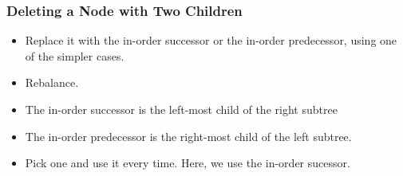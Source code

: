 \documentclass{beamer}
\begin{document}

\begin{frame}
\frametitle{Deleting a Node with Two Children}
\begin{itemize}
\item Replace it with the in-order successor or the in-order predecessor, using one of the simpler cases.
\item Rebalance.
\item The in-order successor is the left-most child of the right subtree
\item The in-order predecessor is the right-most child of the left subtree. 
\item Pick one and use it every time. Here, we use the in-order sucessor.
\end{itemize}
\end{frame}
\end{document}
